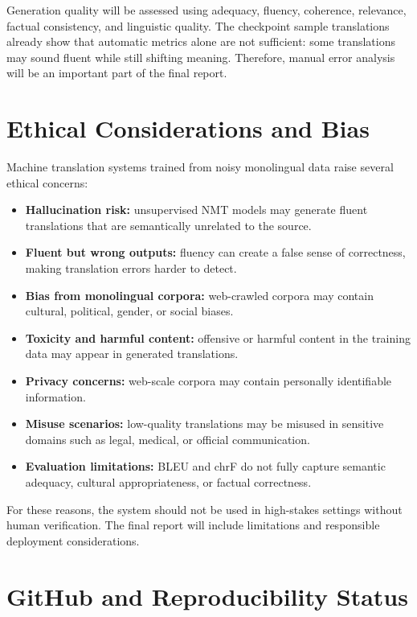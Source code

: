 \documentclass[11pt]{article}
\begin{document}
Generation quality will be assessed using adequacy, fluency, coherence, relevance, factual consistency, and linguistic quality. The checkpoint sample translations already show that automatic metrics alone are not sufficient: some translations may sound fluent while still shifting meaning. Therefore, manual error analysis will be an important part of the final report.

\section{Ethical Considerations and Bias}

Machine translation systems trained from noisy monolingual data raise several ethical concerns:

\begin{itemize}
    \item \textbf{Hallucination risk:} unsupervised NMT models may generate fluent translations that are semantically unrelated to the source.
    \item \textbf{Fluent but wrong outputs:} fluency can create a false sense of correctness, making translation errors harder to detect.
    \item \textbf{Bias from monolingual corpora:} web-crawled corpora may contain cultural, political, gender, or social biases.
    \item \textbf{Toxicity and harmful content:} offensive or harmful content in the training data may appear in generated translations.
    \item \textbf{Privacy concerns:} web-scale corpora may contain personally identifiable information.
    \item \textbf{Misuse scenarios:} low-quality translations may be misused in sensitive domains such as legal, medical, or official communication.
    \item \textbf{Evaluation limitations:} BLEU and chrF do not fully capture semantic adequacy, cultural appropriateness, or factual correctness.
\end{itemize}

For these reasons, the system should not be used in high-stakes settings without human verification. The final report will include limitations and responsible deployment considerations.

\section{GitHub and Reproducibility Status}
\end{document}
